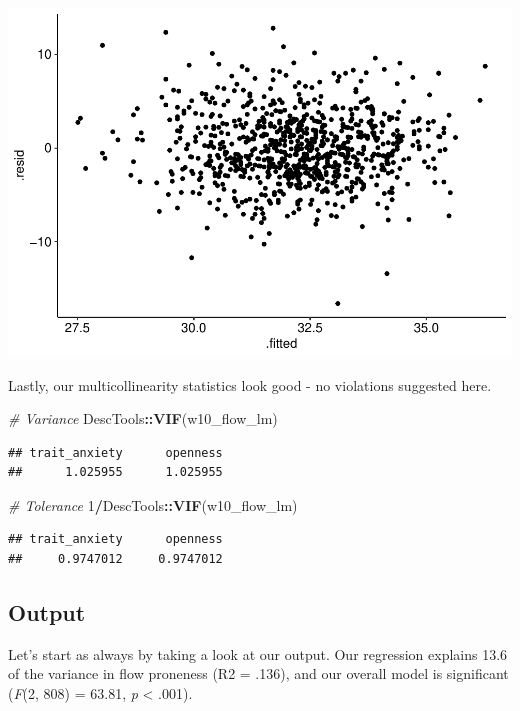 \documentclass[
]{book}
\newenvironment{Shaded}{\begin{snugshade}}{\end{snugshade}}
\newcommand{\CommentTok}[1]{\textcolor[rgb]{0.56,0.35,0.01}{\textit{#1}}}
\newcommand{\DecValTok}[1]{\textcolor[rgb]{0.00,0.00,0.81}{#1}}
\newcommand{\FunctionTok}[1]{\textcolor[rgb]{0.13,0.29,0.53}{\textbf{#1}}}
\newcommand{\NormalTok}[1]{#1}
\newcommand{\SpecialCharTok}[1]{\textcolor[rgb]{0.81,0.36,0.00}{\textbf{#1}}}
\begin{document}
\includegraphics{_main_files/figure-latex/unnamed-chunk-206-1.pdf}

Lastly, our multicollinearity statistics look good - no violations suggested here.

\begin{Shaded}
\begin{Highlighting}[]
\CommentTok{\# Variance}
\NormalTok{DescTools}\SpecialCharTok{::}\FunctionTok{VIF}\NormalTok{(w10\_flow\_lm)}
\end{Highlighting}
\end{Shaded}

\begin{verbatim}
## trait_anxiety      openness 
##      1.025955      1.025955
\end{verbatim}

\begin{Shaded}
\begin{Highlighting}[]
\CommentTok{\# Tolerance}
\DecValTok{1}\SpecialCharTok{/}\NormalTok{DescTools}\SpecialCharTok{::}\FunctionTok{VIF}\NormalTok{(w10\_flow\_lm)}
\end{Highlighting}
\end{Shaded}

\begin{verbatim}
## trait_anxiety      openness 
##     0.9747012     0.9747012
\end{verbatim}

\hypertarget{output-6}{%
\subsection{Output}\label{output-6}}

Let's start as always by taking a look at our output. Our regression explains 13.6 of the variance in flow proneness (R2 = .136), and our overall model is significant (\emph{F}(2, 808) = 63.81, \emph{p} \textless{} .001).
\end{document}
